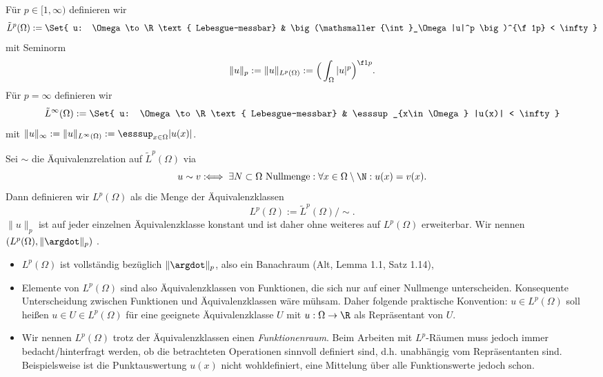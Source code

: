 \begin{df}[$L^p$-Räume] \label{1.4}
	Für $p \in [1, \infty)$ definieren wir
	\[
		\tilde L^p(\Omega) := \Set{ u: \Omega \to \R \text{ Lebesgue-messbar} & \big(\mathsmaller{\int}_\Omega |u|^p \big)^{\f 1p} < \infty}
	\]
	mit Seminorm
	\[
		\|u\|_p := \|u\|_{L^p(\Omega)}  := \Big(\int_\Omega |u|^p \Big)^{\f 1p}.
	\]
	Für $p = \infty$ definieren wir
	\[
		\tilde L^\infty(\Omega) := \Set{ u: \Omega \to \R \text{ Lebesgue-messbar} & \esssup_{x\in \Omega} |u(x)| < \infty }
	\]
	mit $\|u\|_\infty := \|u\|_{L^\infty(\Omega)} := \esssup_{x\in \Omega} |u(x)|$.

	Sei $\sim$ die Äquivalenzrelation auf $\tilde L^p(\Omega)$ via
	\[
		u \sim v \defiff \exists N \subset \Omega \text{ Nullmenge} : \forall x \in \Omega \setminus \N : u(x) = v(x).
	\]
	Dann definieren wir $L^p(\Omega)$ als die Menge der Äquivalenzklassen
	\[
		L^p(\Omega) := \tilde L^p(\Omega) / \sim.
	\]
	$\|u\|_p$ ist auf jeder einzelnen Äquivalenzklasse konstant und ist daher ohne weiteres auf $L^p(\Omega)$ erweiterbar.
	Wir nennen $(L^p(\Omega), \|\argdot\|_p)$ .
	\begin{note}
		\begin{itemize}
			\item
				$L^p(\Omega)$ ist vollständig bezüglich $\|\argdot\|_p$, also ein Banachraum (Alt, Lemma 1.1, Satz 1.14),
			\item
				Elemente von $L^p(\Omega)$ sind also Äquivalenzklassen von Funktionen, die sich nur auf einer Nullmenge unterscheiden.
				Konsequente Unterscheidung zwischen Funktionen und Äquivalenzklassen wäre mühsam.
				Daher folgende praktische Konvention: $u \in L^p(\Omega)$ soll heißen $u \in U \in L^p(\Omega)$ für eine geeignete Äquivalenzklasse $U$ mit $u: \Omega \to \R$ als Repräsentant von $U$.
			\item
				Wir nennen $L^p(\Omega)$ trotz der Äquivalenzklassen einen \emph{Funktionenraum}.
				Beim Arbeiten mit $L^p$-Räumen muss jedoch immer bedacht/hinterfragt werden, ob die betrachteten Operationen sinnvoll definiert sind, d.h. unabhängig vom Repräsentanten sind.
				Beispielsweise ist die Punktauswertung $u(x)$ nicht wohldefiniert, eine Mittelung über alle Funktionswerte jedoch schon.
		\end{itemize}
	\end{note}
\end{df}


